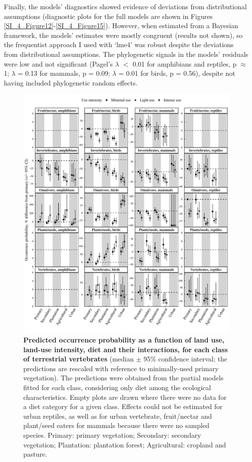 Finally, the models' diagnostics showed evidence of deviations from distributional assumptions (diagnostic plots for the full models are shown in Figures \ref{SI_4_Figure12}-\ref{SI_4_Figure15}). However, when estimated from a Bayesian framework, the models’ estimates were mostly congruent (results not shown), so the frequentist approach I used with `lme4' was robust despite the deviations from distributional assumptions. The phylogenetic signals in the models' residuals were low and not significant (Pagel’s $\lambda$ $<$ 0.01 for amphibians and reptiles, p $\approx$ 1; $\lambda$  = 0.13 for mammals, p = 0.09; $\lambda$  = 0.01 for birds, p = 0.56), despite not having included phylogenetic random effects.

\pagebreak
\begin{figure}[h!]
\centering
\includegraphics[scale=0.7]{figures/Chapter4/Figure3_V2}
\caption[Predicted occurrence probability as a function of land use, land-use intensity, diet and their interactions, for each class of terrestrial vertebrates.]{\textbf{Predicted occurrence probability as a function of land use, land-use intensity, diet and their interactions, for each class of terrestrial vertebrates} (median $\pm$ 95\% confidence interval; the predictions are rescaled with reference to minimally-used primary vegetation). The predictions were obtained from the partial models fitted for each class, considering only diet among the ecological characteristics. Empty plots are drawn where there were no data for a diet category for a given class. Effects could not be estimated for urban reptiles, as well as for urban vertebrate, fruit/nectar and plant/seed eaters for mammals because there were no sampled species. Primary: primary vegetation; Secondary: secondary vegetation; Plantation: plantation forest; Agricultural: cropland and pasture.}
\label{chap4_fig3}
\end{figure}


